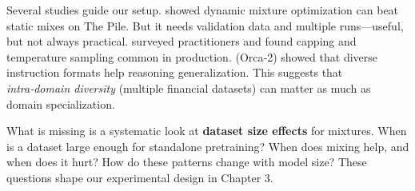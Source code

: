 Several studies guide our setup. \textcite{xie2023doremi} showed dynamic mixture optimization can beat static mixes on The Pile. But it needs validation data and multiple runs—useful, but not always practical. \textcite{longpre2023pretrainer} surveyed practitioners and found capping and temperature sampling common in production. \textcite{mitra2023orca2} (Orca‑2) showed that diverse instruction formats help reasoning generalization. This suggests that \textit{intra‑domain diversity} (multiple financial datasets) can matter as much as domain specialization.

What is missing is a systematic look at \textbf{dataset size effects} for mixtures. When is a dataset large enough for standalone pretraining? When does mixing help, and when does it hurt? How do these patterns change with model size? These questions shape our experimental design in Chapter 3.
